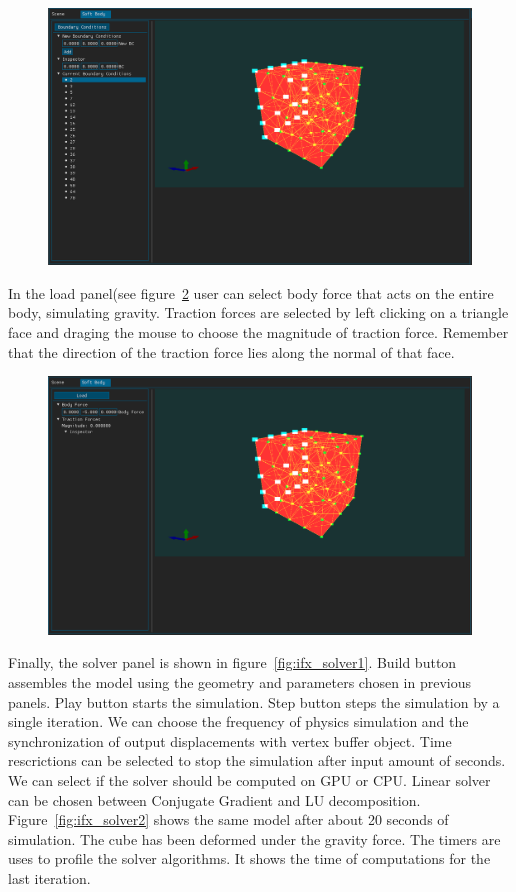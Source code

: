 \documentclass[en]{minipw} %
\begin{document}
\begin{figure}[h!]
\centering
\includegraphics[scale=0.5]{pictures/ifx/ifx_bc.png}
\caption[Logo MiNI]{}
\label{fig:ifx_bc}
\end{figure}

In the load panel(see figure~\ref{fig:ifx_load} user can select body force that acts on the entire body, simulating gravity. Traction forces are selected by left clicking on a triangle face and draging the mouse to choose the magnitude of traction force. Remember that the direction of the traction force lies along the normal of that face.

\begin{figure}[h!]
\centering
\includegraphics[scale=0.5]{pictures/ifx/ifx_load.png}
\caption[Logo MiNI]{}
\label{fig:ifx_load}
\end{figure}

Finally, the solver panel is shown in figure~\ref{fig:ifx_solver1}. Build button assembles the model using the geometry and parameters chosen in previous panels. Play button starts the simulation. Step button steps the simulation by a single iteration. We can choose the frequency of physics simulation and the synchronization of output displacements with vertex buffer object. Time rescrictions can be selected to stop the simulation after input amount of seconds. We can select if the solver should be computed on GPU or CPU. Linear solver can be chosen between Conjugate Gradient and LU decomposition. Figure~\ref{fig:ifx_solver2} shows the same model after about 20 seconds of simulation. The cube has been deformed under the gravity force. The timers are uses to profile the solver algorithms. It shows the time of computations for the last iteration.
\end{document}
